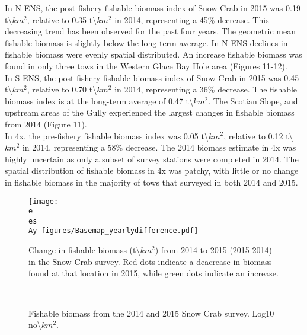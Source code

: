 \documentclass[paper=a4, fontsize=11pt]{article}
\newcommand{\D}{.}
\newcommand{\e}{/home/michelle/ecomod_data/}
\newcommand{\es}{snowcrab/}
\newcommand{\Ay}{assessments/2015/}
\begin{document}
In N-ENS, the post-fishery fishable biomass index of Snow Crab in 2015 was 0.19 t\textbackslash$km^2$, relative to 0.35 t\textbackslash$km^2$ in 2014, representing a 45\% decrease. This decreasing trend has been observed for the past four years. The geometric mean fishable biomass is slightly below the long-term average. In N-ENS declines in fishable biomass were evenly spatial distributed. An increase fishable biomass was found in only three tows in the Western Glace Bay Hole area (Figures 11-12).\\

In S-ENS, the post-fishery fishable biomass index of Snow Crab in 2015 was 0.45 t\textbackslash$km^2$, relative to 0.70 t\textbackslash$km^2$ in 2014, representing a 36\% decrease. The fishable biomass index is at the long-term average of 0.47 t\textbackslash$km^2$. The Scotian Slope, and upstream areas of the Gully experienced the largest changes in fishable biomass from 2014 (Figure 11).\\

In 4x, the pre-fishery fishable biomass index was 0.05 t\textbackslash$km^2$, relative to 0.12 t\textbackslash$km^2$ in 2014, representing a 58\% decrease. The 2014 biomass estimate in 4x was highly uncertain as only a subset of survey stations were completed in 2014. The spatial distribution of fishable biomass in 4x was patchy, with little or no change in fishable biomass in the majority of tows that surveyed in both 2014 and 2015.\\


\begin{figure}[ht]
    \centering
    \texttt{[image: \\e \\es \\Ay figures/Basemap\_yearlydifference.pdf]}
    \caption{Change in fishable biomass (t\textbackslash$km^2$) from 2014 to 2015 (2015-2014) in the Snow Crab survey. Red dots indicate a deacrease in biomass found at that location in 2015, while green dots indicate an increase. }
\end{figure}

\begin{figure}[ht]
    \centering
    \\
    \vspace{1cm}
    \caption{Fishable biomass from the 2014 and 2015 Snow Crab survey. Log10 
    no\textbackslash$km^2$.}
\end{figure}
\end{document}
